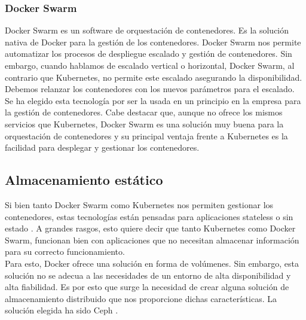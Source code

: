 		\subsubsection{Docker Swarm}
		\begin{paragraph}
			Docker Swarm es un software de orquestación de contenedores. Es la solución nativa de Docker para la gestión de los contenedores. Docker Swarm nos permite automatizar los procesos de despliegue escalado y gestión de contenedores. Sin embargo, cuando hablamos de escalado vertical o horizontal, Docker Swarm, al contrario que Kubernetes, no permite este escalado asegurando la disponibilidad. Debemos relanzar los contenedores con los nuevos parámetros para el escalado. \\
			Se ha elegido esta tecnología por ser la usada en un principio en la empresa para la gestión de contenedores. Cabe destacar que, aunque no ofrece los mismos servicios que Kubernetes, Docker Swarm es una solución muy buena para la orquestación de contenedores y su principal ventaja frente a Kubernetes es la facilidad para desplegar y gestionar los contenedores.
		\end{paragraph}
	\subsection{Almacenamiento estático}
		\label{ceph}
		\begin{paragraph}
			Si bien tanto Docker Swarm como Kubernetes nos permiten gestionar los contenedores, estas tecnologías están pensadas para aplicaciones stateless o sin estado \cite{stateless:online}. A grandes rasgos, esto quiere decir que tanto Kubernetes como Docker Swarm, funcionan bien con aplicaciones que no necesitan almacenar información para su correcto funcionamiento. \\
			Para esto, Docker ofrece una solución en forma de volúmenes. Sin embargo, esta solución no se adecua a las necesidades de un entorno de alta disponibilidad  y alta fiabilidad. Es por esto que surge la necesidad de crear alguna solución de almacenamiento distribuido que nos proporcione dichas características. La solución elegida ha sido Ceph \cite{ceph:online}.
		\end{paragraph}
